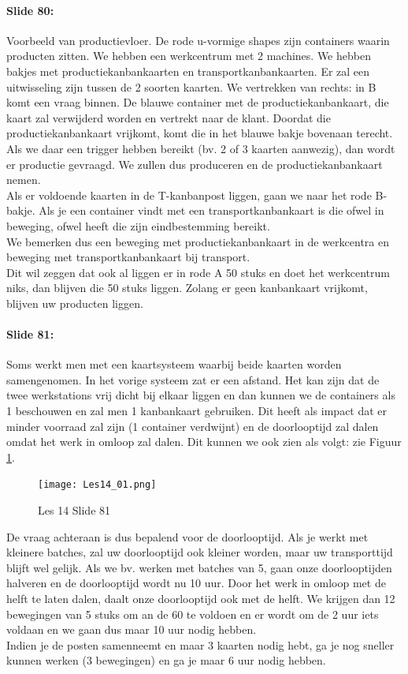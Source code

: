 \documentclass[10pt,a4paper]{report}
\begin{document}
\paragraph{Slide 80:} Voorbeeld van productievloer. De rode u-vormige shapes zijn containers waarin producten zitten. We hebben een werkcentrum met 2 machines. We hebben bakjes met productiekanbankaarten en transportkanbankaarten. Er zal een uitwisseling zijn tussen de 2 soorten kaarten. We vertrekken van rechts: in B komt een vraag binnen. De blauwe container met de productiekanbankaart, die kaart zal verwijderd worden en vertrekt naar de klant. Doordat die productiekanbankaart vrijkomt, komt die in het blauwe bakje bovenaan terecht. Als we daar een trigger hebben bereikt (bv. 2 of 3 kaarten aanwezig), dan wordt er productie gevraagd. We zullen dus produceren en de productiekanbankaart nemen. \\ %
Als er voldoende kaarten in de T-kanbanpost liggen, gaan we naar het rode B-bakje. Als je een container vindt met een transportkanbankaart is die ofwel in beweging, ofwel heeft die zijn eindbestemming bereikt. \\
We bemerken dus een beweging met productiekanbankaart in de werkcentra en beweging met transportkanbankaart bij transport.\\
Dit wil zeggen dat ook al liggen er in rode A 50 stuks en doet het werkcentrum niks, dan blijven die 50 stuks liggen. Zolang er geen kanbankaart vrijkomt, blijven uw producten liggen. 

\paragraph{Slide 81:} Soms werkt men met een kaartsysteem waarbij beide kaarten worden samengenomen. In het vorige systeem zat er een afstand. Het kan zijn dat de twee werkstations vrij dicht bij elkaar liggen en dan kunnen we de containers als 1 beschouwen en zal men 1 kanbankaart gebruiken. Dit heeft als impact dat er minder voorraad zal zijn (1 container verdwijnt) en de doorlooptijd zal dalen omdat het werk in omloop zal dalen. Dit kunnen we ook zien als volgt: zie Figuur \ref{les14_01}.\\

\begin{figure}[h!]
\centering
\texttt{[image: Les14\_01.png]}
\caption{Les 14 Slide 81} 
\label{les14_01}
\end{figure}

De vraag achteraan is dus bepalend voor de doorlooptijd. Als je werkt met kleinere batches, zal uw doorlooptijd ook kleiner worden, maar uw transporttijd blijft wel gelijk. Als we bv. werken met batches van 5, gaan onze doorlooptijden halveren en de doorlooptijd wordt nu 10 uur. Door het werk in omloop met de helft te laten dalen, daalt onze doorlooptijd ook met de helft. We krijgen dan 12 bewegingen van 5 stuks om an de 60 te voldoen en er wordt om de 2 uur iets voldaan en we gaan dus maar 10 uur nodig hebben. \\
Indien je de posten samenneemt en maar 3 kaarten nodig hebt, ga je nog sneller kunnen werken (3 bewegingen) en ga je maar 6 uur nodig hebben. 
\end{document}
